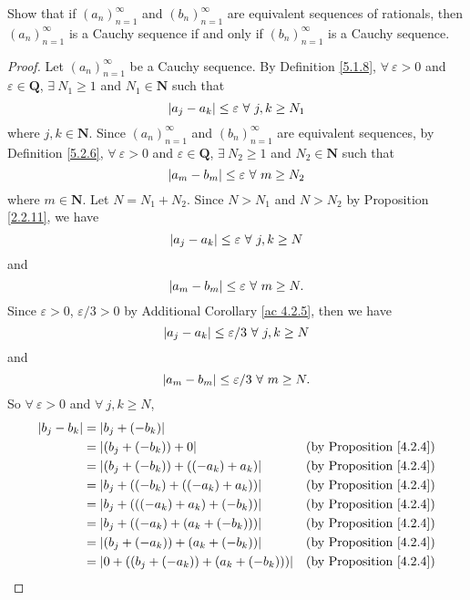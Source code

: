 \exercisesection

\begin{exercise}\label{ex 5.2.1}
Show that if \((a_n)_{n = 1}^{\infty}\) and \((b_n)_{n = 1}^{\infty}\) are equivalent sequences of rationals, then \((a_n)_{n = 1}^{\infty}\) is a Cauchy sequence if and only if \((b_n)_{n = 1}^{\infty}\) is a Cauchy sequence.
\end{exercise}

\begin{proof}
Let \((a_n)_{n = 1}^{\infty}\) be a Cauchy sequence.
By Definition \ref{5.1.8}, \(\forall\ \varepsilon > 0\) and \(\varepsilon \in \mathbf{Q}\), \(\exists\ N_1 \geq 1\) and \(N_1 \in \mathbf{N}\) such that
\[
    \abs*{a_j - a_k} \leq \varepsilon \ \forall\ j, k \geq N_1
\]
where \(j, k \in \mathbf{N}\).
Since \((a_n)_{n = 1}^{\infty}\) and \((b_n)_{n = 1}^{\infty}\) are equivalent sequences, by Definition \ref{5.2.6}, \(\forall\ \varepsilon > 0\) and \(\varepsilon \in \mathbf{Q}\), \(\exists\ N_2 \geq 1\) and \(N_2 \in \mathbf{N}\) such that
\[
    \abs*{a_m - b_m} \leq \varepsilon \ \forall\ m \geq N_2
\]
where \(m \in \mathbf{N}\).
Let \(N = N_1 + N_2\).
Since \(N > N_1\) and \(N > N_2\) by Proposition \ref{2.2.11}, we have
\[
    \abs*{a_j - a_k} \leq \varepsilon \ \forall\ j, k \geq N
\]
and
\[
    \abs*{a_m - b_m} \leq \varepsilon \ \forall\ m \geq N.
\]
Since \(\varepsilon > 0\), \(\varepsilon / 3 > 0\) by Additional Corollary \ref{ac 4.2.5}, then we have
\[
    \abs*{a_j - a_k} \leq \varepsilon / 3 \ \forall\ j, k \geq N
\]
and
\[
    \abs*{a_m - b_m} \leq \varepsilon / 3 \ \forall\ m \geq N.
\]
So \(\forall\ \varepsilon > 0\) and \(\forall\ j, k \geq N\),
\begin{align*}
\abs*{b_j - b_k} &= \abs*{b_j + (-b_k)} \\
&= \abs*{(b_j + (-b_k)) + 0} & \text{(by Proposition \ref{4.2.4})} \\
&= \abs*{(b_j + (-b_k)) + ((-a_k) + a_k)} & \text{(by Proposition \ref{4.2.4})} \\
&= \abs*{b_j + ((-b_k) + ((-a_k) + a_k))} & \text{(by Proposition \ref{4.2.4})} \\
&= \abs*{b_j + (((-a_k) + a_k) + (-b_k))} & \text{(by Proposition \ref{4.2.4})} \\
&= \abs*{b_j + ((-a_k) + (a_k + (-b_k)))} & \text{(by Proposition \ref{4.2.4})} \\
&= \abs*{(b_j + (-a_k)) + (a_k + (-b_k))} & \text{(by Proposition \ref{4.2.4})} \\
&= \abs*{0 + ((b_j + (-a_k)) + (a_k + (-b_k)))} & \text{(by Proposition \ref{4.2.4})} \\

\end{align*}
\end{proof}
